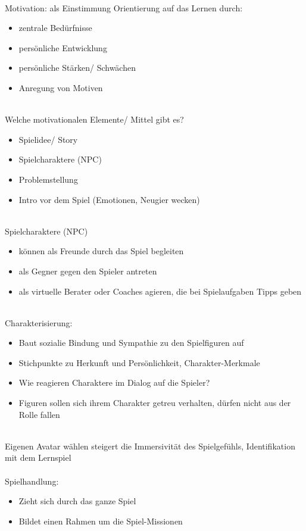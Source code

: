 \documentclass[a4paper]{article}
\begin{document}
~\\
Motivation: als Einstimmung Orientierung auf das Lernen durch:
\begin{itemize}
	\item zentrale Bedürfnisse
	\item persönliche Entwicklung
	\item persönliche Stärken/ Schwächen
	\item Anregung von Motiven
\end{itemize}
~\\
Welche motivationalen Elemente/ Mittel gibt es?
\begin{itemize}
	\item Spielidee/ Story
	\item Spielcharaktere (NPC)
	\item Problemstellung
	\item Intro vor dem Spiel (Emotionen, Neugier wecken)
\end{itemize}
~\\
Spielcharaktere (NPC)
\begin{itemize}
	\item können als Freunde durch das Spiel begleiten
	\item als Gegner gegen den Spieler antreten
	\item als virtuelle Berater oder Coaches agieren, die bei Spielaufgaben Tipps geben
\end{itemize}
~\\
Charakterisierung:
\begin{itemize}
	\item Baut sozialie Bindung und Sympathie zu den Spielfiguren auf
	\item Stichpunkte zu Herkunft und Persönlichkeit, Charakter-Merkmale
	\item Wie reagieren Charaktere im Dialog auf die Spieler?
	\item Figuren sollen sich ihrem Charakter getreu verhalten, dürfen nicht aus der Rolle fallen
\end{itemize}
~\\
Eigenen Avatar wählen steigert die Immersivität des Spielgefühls, Identifikation mit dem Lernspiel
\\~\\
Spielhandlung:
\begin{itemize}
	\item Zieht sich durch das ganze Spiel
	\item Bildet einen Rahmen um die Spiel-Missionen
\end{itemize}
\end{document}
